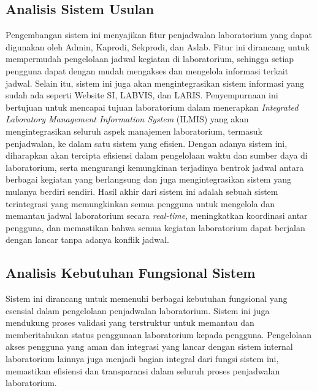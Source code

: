 \subsection{Analisis Sistem Usulan}
Pengembangan sistem ini menyajikan fitur penjadwalan laboratorium yang dapat digunakan oleh Admin, Kaprodi, Sekprodi, dan Aslab. Fitur ini dirancang untuk mempermudah pengelolaan jadwal kegiatan di laboratorium, sehingga setiap pengguna dapat dengan mudah mengakses dan mengelola informasi terkait jadwal. Selain itu, sistem ini juga akan mengintegrasikan sistem informasi yang sudah ada seperti Website SI, LABVIS, dan LARIS. Penyempurnaan ini bertujuan untuk mencapai tujuan laboratorium dalam menerapkan \textit{Integrated Laboratory Management Information System} (ILMIS) yang akan mengintegrasikan seluruh aspek manajemen laboratorium, termasuk penjadwalan, ke dalam satu sistem yang efisien. Dengan adanya sistem ini, diharapkan akan tercipta efisiensi dalam pengelolaan waktu dan sumber daya di laboratorium, serta mengurangi kemungkinan terjadinya bentrok jadwal antara berbagai kegiatan yang berlangsung dan juga mengintegrasikan sistem yang mulanya berdiri sendiri. Hasil akhir dari sistem ini adalah sebuah sistem terintegrasi yang memungkinkan semua pengguna untuk mengelola dan memantau jadwal laboratorium secara \textit{real-time}, meningkatkan koordinasi antar pengguna, dan memastikan bahwa semua kegiatan laboratorium dapat berjalan dengan lancar tanpa adanya konflik jadwal.

\subsection{Analisis Kebutuhan Fungsional Sistem}
Sistem ini dirancang untuk memenuhi berbagai kebutuhan fungsional yang esensial dalam pengelolaan penjadwalan laboratorium. Sistem ini juga mendukung proses validasi yang terstruktur  untuk memantau dan memberitahukan status penggunaan laboratorium kepada pengguna. Pengelolaan akses pengguna yang aman dan integrasi yang lancar dengan sistem internal laboratorium lainnya juga menjadi bagian integral dari fungsi sistem ini, memastikan efisiensi dan transparansi dalam seluruh proses penjadwalan laboratorium.

